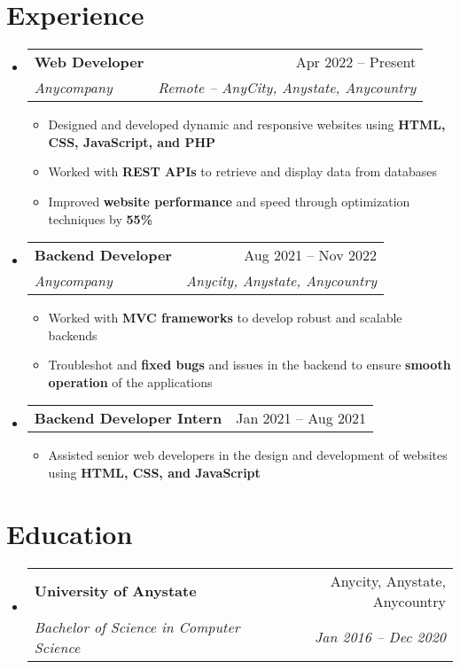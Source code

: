 \documentclass[a4paper,11pt]{article}
\makeatletter
\newcommand{\resumeItem}[1]{
  \item\small{#1}
}
\newcommand{\resumeItemListStart}{\begin{itemize}[rightmargin=0.11in]}
\newcommand{\resumeItemListEnd}{\end{itemize}}
\newcommand{\resumeQuadHeading}[4]{
  \item
  \begin{tabular*}{0.96\textwidth}[t]{l@{\extracolsep{\fill}}r}
    \textbf{#1} & #2 \\
    \textit{\small#3} & \textit{\small #4} \\
  \end{tabular*}
}
\newcommand{\resumeQuadHeadingChild}[2]{
  \item
  \begin{tabular*}{0.96\textwidth}[t]{l@{\extracolsep{\fill}}r}
    \textbf{\small#1} & {\small#2} \\
  \end{tabular*}
}
\newcommand{\resumeHeadingListStart}{
  \begin{itemize}[leftmargin=0.15in, label={}]
}
\newcommand{\resumeHeadingListEnd}{\end{itemize}}
\makeatother
\begin{document}

\section{Experience}
\resumeHeadingListStart{}
\resumeQuadHeading{Web Developer}{Apr 2022 -- Present}
{Anycompany}{Remote -- AnyCity, Anystate, Anycountry}
\resumeItemListStart{}
\resumeItem{Designed and developed dynamic and responsive websites using \textbf{HTML, CSS, JavaScript, and PHP}}
\resumeItem{Worked with \textbf{REST APIs} to retrieve and display data from databases}
\resumeItem{Improved \textbf{website performance} and speed through optimization techniques by \textbf{55\%}}
\resumeItemListEnd{}

\resumeQuadHeading{Backend Developer}{Aug 2021 -- Nov 2022}
{Anycompany}{Anycity, Anystate, Anycountry}
\resumeItemListStart{}
\resumeItem{Worked with \textbf{MVC frameworks} to develop robust and scalable backends}
\resumeItem{Troubleshot and \textbf{fixed bugs} and issues in the backend to ensure \textbf{smooth operation} of the applications}
\resumeItemListEnd{}

\resumeQuadHeadingChild{Backend Developer Intern}{Jan 2021 -- Aug 2021}
\resumeItemListStart{}
\resumeItem{Assisted senior web developers in the design and development of websites using \textbf{HTML, CSS, and JavaScript}}
\resumeItemListEnd{}
\resumeHeadingListEnd{}



\section{Education}
\resumeHeadingListStart{}
\resumeQuadHeading{University of Anystate}{Anycity, Anystate, Anycountry}
{Bachelor of Science in Computer Science}{Jan 2016 -- Dec 2020}
\resumeHeadingListEnd{}


\end{document}
